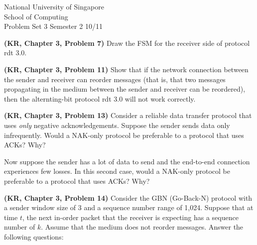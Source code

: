 \documentclass[a4paper,11pt]{exam}
\begin{document}
    \extraheadheight{.5in}
    {\large\sf National University of Singapore\\ School of Computing \\
    \LARGE\sf Problem Set 3}%
    {\large\sf Semester 2 10/11}
    \firstpageheadrule
    \pagestyle{headandfoot}

    \begin{questions}
	\question \textbf{(KR, Chapter 3, Problem 7)} 
	Draw the FSM for the receiver side of protocol rdt 3.0.

	\question \textbf{(KR, Chapter 3, Problem 11)} 
	Show that if the network connection between the sender and 
	receiver can reorder messages (that is, that two messages 
	propagating in the medium between the sender and receiver 
	can be reordered), then the alternting-bit protocol rdt 3.0 
	will not work correctly.  

	\question \textbf{(KR, Chapter 3, Problem 13)} 
	Consider a reliable data transfer protocol that uses \textit{only}
	negative acknowledgements.  Suppose the sender sends data only
	infrequently.  Would a NAK-only protocol be preferable to 
	a protocol that uses ACKs?  Why?  
	
	Now suppose the sender has a lot of data to send and the 
	end-to-end connection experiences few losses.  In this
	second case, would a NAK-only protocol be preferable to a 
	protocol that uses ACKs?  Why?

	\question \textbf{(KR, Chapter 3, Problem 14)} 
	Consider the GBN (Go-Back-N) protocol with a sender window size of 3 and a sequence
	number range of 1,024. Suppose that at time $t$, the next in-order packet
	that the receiver is expecting has a sequence number of $k$. Assume that the
	medium does not reorder messages. Answer the following questions:


\end{questions}
\end{document}
